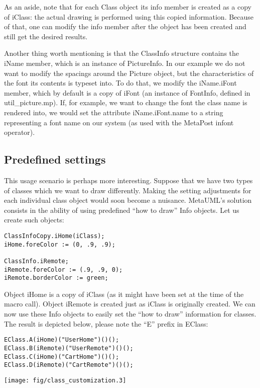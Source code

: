 \documentclass{article}
\newcommand{\code}{\ttfamily}
\newcommand{\metauml}{MetaUML}
\begin{document}
As an aside, note that for each {\code Class} object its {\code info} member is created as
a copy of {\code iClass}: the actual drawing is performed using this copied
information. Because of that, one can modify the {\code info} member after the object
has been created and still get the desired results.

Another thing worth mentioning is that the {\code ClassInfo} structure contains
the {\code iName} member, which is an instance of {\code PictureInfo}. In our example we
do not want to modify the spacings around the {\code Picture} object,
but the characteristics of the font its contents is typeset into. To do that,
we modify the {\code iName.iFont} member, which by default is a copy of {\code iFont}
(an instance of {\code FontInfo}, defined in {\code util\_picture.mp}).
If, for example, we want to change the font the class name is rendered into, we would set
the attribute {\code iName.iFont.name} to a string representing a font name
on our system (as used with the MetaPost {\code infont} operator).


\subsection{Predefined settings}

This usage scenario is perhaps more interesting. Suppose that we have two
types of classes which we want to draw differently. Making the setting adjustments
for each individual class object would soon become a nuisance. \metauml's solution consists in the
ability of using predefined ``how to draw'' {\code Info} objects. Let us create such objects:

\begin{verbatim}
ClassInfoCopy.iHome(iClass);
iHome.foreColor := (0, .9, .9);

ClassInfo.iRemote;
iRemote.foreColor := (.9, .9, 0);
iRemote.borderColor := green;
\end{verbatim}

Object {\code iHome} is a copy of {\code iClass} (as it might have been set at
the time of the macro call). Object {\code iRemote} is created just as {\code iClass}
is originally created. We can now use these {\code Info} objects to easily set the
``how to draw'' information for classes. The result is depicted below,
please note the ``{\code E}'' prefix in {\code EClass}:

\begin{multicols}{2}
\begin{verbatim}
EClass.A(iHome)("UserHome")()();
EClass.B(iRemote)("UserRemote")()();
EClass.C(iHome)("CartHome")()();
EClass.D(iRemote)("CartRemote")()();
\end{verbatim}
\columnbreak
\hspace{1cm}\texttt{[image: fig/class\_customization.3]}
\end{multicols}
\end{document}
